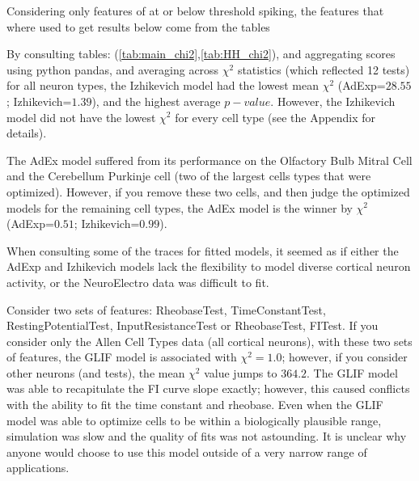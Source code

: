 Considering only features of at or below threshold spiking, the features that where used to get results below come from the tables 

By consulting tables: (\ref{tab:main_chi2},\ref{tab:HH_chi2}), and aggregating scores using python pandas, and averaging across $\chi^{2}$ statistics (which reflected 12 tests) for all neuron types, the Izhikevich model had the lowest mean $\chi^{2}$ (AdExp=$28.55$; Izhikevich=$1.39$), and the highest average $p-value$.
However, the Izhikevich model did not have the lowest $\chi^{2}$ for every cell type (see the Appendix for details).


The AdEx model suffered from its performance on the Olfactory Bulb Mitral Cell and the Cerebellum Purkinje cell (two of the largest cells types that were optimized). 
However, if you remove these two cells, and then judge the optimized models for the remaining cell types, the AdEx model is the winner by $\chi^{2}$ (AdExp=$0.51$; Izhikevich=$0.99$).

When consulting some of the traces for fitted models, it seemed as if either the AdExp and Izhikevich models lack the flexibility to model diverse cortical neuron activity, or the NeuroElectro data was difficult to fit.



Consider two sets of features: {RheobaseTest, TimeConstantTest, RestingPotentialTest, InputResistanceTest} or {RheobaseTest, FITest}. If you consider only the Allen Cell Types data (all cortical neurons), with these two sets of features, the GLIF model is associated with $\chi^{2}=1.0$; however, if you consider other neurons (and tests), the mean $\chi^{2}$ value jumps to $364.2$. The GLIF model was able to recapitulate the FI curve slope exactly; however, this caused conflicts with the ability to fit the time constant and rheobase. Even when the GLIF model was able to optimize cells to be within a biologically plausible range, simulation was slow and the quality of fits was not astounding. It is unclear why anyone would choose to use this model outside of a very narrow range of applications.

